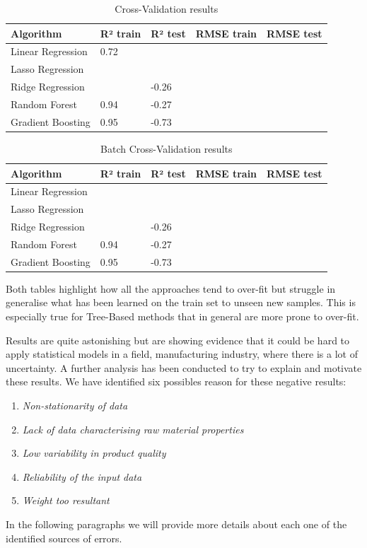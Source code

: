\begin{table}[]
\caption{Cross-Validation results}
\label{tab:cross_validation_results}
\begin{tabular}{lllll}
\toprule
\textbf{Algorithm} & \textbf{R² train} & \textbf{R² test} & \textbf{RMSE train} & \textbf{RMSE test} \\
\midrule
Linear Regression   & 0.72   &         &    &   \\ 
Lasso Regression    &        &         &    &   \\ 
Ridge Regression    &        & -0.26   &    &   \\ 
Random Forest       & 0.94   & -0.27   &    &   \\ 
Gradient Boosting   & 0.95   & -0.73   &    &   \\ 
\bottomrule
\end{tabular}
\end{table}


\begin{table}[]
\caption{Batch Cross-Validation results}
\label{tab:batch_cross_validation_results}
\begin{tabular}{lllll}
\toprule
\textbf{Algorithm} & \textbf{R² train} & \textbf{R² test} & \textbf{RMSE train} & \textbf{RMSE test} \\
\midrule
Linear Regression    &         &          &     &     \\ 
Lasso Regression     &         &          &     &     \\ 
Ridge Regression     &         & -0.26    &     &     \\ 
Random Forest        & 0.94    & -0.27    &     &     \\ 
Gradient Boosting    & 0.95    & -0.73    &     &     \\ 
\bottomrule
\end{tabular}
\end{table}

Both tables highlight how all the approaches tend to over-fit but struggle in generalise what has been learned on the train set to unseen new samples. This is especially true for Tree-Based methods that in general are more prone to over-fit. 

Results are quite astonishing but are showing evidence that it could be hard to apply statistical models in a field, manufacturing industry, where there is a lot of uncertainty. A further analysis has been conducted to try to explain and motivate these results. We have identified six possibles reason for these negative results:
%
\begin{enumerate}
    \item \textit{Non-stationarity of data}
    \item \textit{Lack of data characterising raw material properties}
    \item \textit{Low variability in product quality}
    \item \textit{Reliability of the input data}
    \item \textit{Weight too resultant}
\end{enumerate}
%
In the following paragraphs we will provide more details about each one of the identified sources of errors. 


